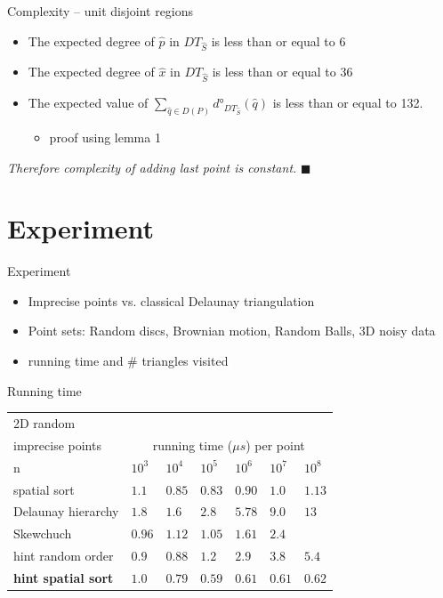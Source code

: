 \documentclass{beamer}
\begin{document}
\begin{frame}{Complexity -- unit disjoint regions}

\begin{itemize}
\item The expected degree of $\hat{p}$ in $DT_{\hat{S}}$ is less than or equal to 6
\item The expected degree of $\hat{x}$ in $DT_{\hat{S}}$ is less than or equal to 36
\item The expected value of $\sum_{\hat{q}\in D(P)} d°_{DT_{\hat{S}}}(\hat{q})$ is less than or equal to 132.
\begin{itemize}
\item proof using lemma 1
\end{itemize}
\end{itemize}

\textit{Therefore complexity of adding last point is constant.} $\blacksquare$
\end{frame}

\section{Experiment}
\frame{\tableofcontents[currentsection]}
\begin{frame}{Experiment}
\begin{itemize}
\item Imprecise points vs. classical Delaunay triangulation
\item Point sets: Random discs, Brownian motion, Random Balls, 3D noisy data
\item running time and \# triangles visited
\end{itemize}
\end{frame}

\begin{frame}{Running time}
\begin{tabular}{|l||l|l|l|l|l|l|}
\hline
2D random \\
imprecise points & \multicolumn{6}{|c|}{running time  ($\mu s$) per point}\\
 \hline \hline
    n & $10^3$ & $10^4$ & $10^5$ & $10^6$ & $10^7$ & $10^8$\\\hline
    spatial sort & $1.1$ & $0.85 $ & $0.83 $ & $0.90 $ & $1.0 $ & $1.13$\\\hline
    Delaunay hierarchy & $1.8$ & $1.6$ & $2.8 $ & $5.78 $ & $9.0$ & $13$\\\hline
    Skewchuch & $0.96 $ & $1.12$ & $1.05 $ & $1.61 $ & $2.4$ &\\\hline
    hint random order & $0.9 $ & $0.88 $ & $1.2 $ & $2.9 $ & $3.8$ & $5.4$\\\hline
    \textbf{hint spatial sort} & $1.0 $ & $0.79$ & $0.59$ & $0.61 $ & $0.61 $ & $0.62$\\\hline
\end{tabular}
\end{frame}
\end{document}
